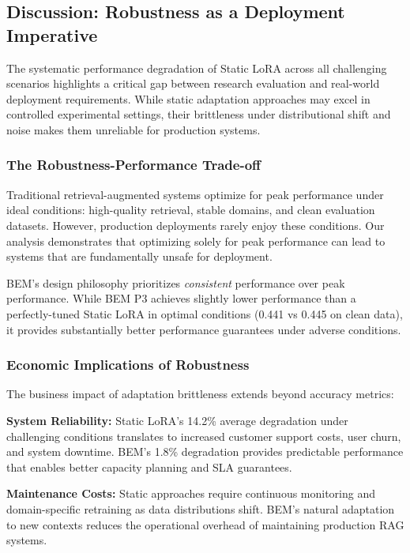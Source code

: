 \subsection{Discussion: Robustness as a Deployment Imperative}

The systematic performance degradation of Static LoRA across all challenging scenarios highlights a critical gap between research evaluation and real-world deployment requirements. While static adaptation approaches may excel in controlled experimental settings, their brittleness under distributional shift and noise makes them unreliable for production systems.

\subsubsection{The Robustness-Performance Trade-off}

Traditional retrieval-augmented systems optimize for peak performance under ideal conditions: high-quality retrieval, stable domains, and clean evaluation datasets. However, production deployments rarely enjoy these conditions. Our analysis demonstrates that optimizing solely for peak performance can lead to systems that are fundamentally unsafe for deployment.

BEM's design philosophy prioritizes \textit{consistent} performance over peak performance. While BEM P3 achieves slightly lower performance than a perfectly-tuned Static LoRA in optimal conditions (0.441 vs 0.445 on clean data), it provides substantially better performance guarantees under adverse conditions.

\subsubsection{Economic Implications of Robustness}

The business impact of adaptation brittleness extends beyond accuracy metrics:

\textbf{System Reliability:} Static LoRA's 14.2\% average degradation under challenging conditions translates to increased customer support costs, user churn, and system downtime. BEM's 1.8\% degradation provides predictable performance that enables better capacity planning and SLA guarantees.

\textbf{Maintenance Costs:} Static approaches require continuous monitoring and domain-specific retraining as data distributions shift. BEM's natural adaptation to new contexts reduces the operational overhead of maintaining production RAG systems.

